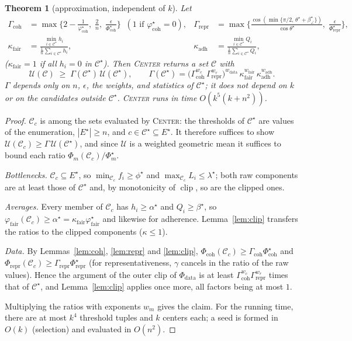 \documentclass[10pt]{article}
\newtheorem{theorem}{Theorem}
\theoremstyle{remark}
\theoremstyle{definition}
\newcommand{\coh}{\varphi_{\text{coh}}}
\newcommand{\clip}{\operatorname{clip}}
\newcommand{\C}{\mathcal{C}}
\begin{document}
\begin{theorem}[approximation, independent of $k$]\label{thm:main}
Let
\begin{align*}
\Gamma_{\text{coh}} &= \max\Big\{ 2 - \tfrac{1}{\coh^\star},\; \tfrac{2}{n},\; \tfrac{\epsilon}{\Phi_{\text{coh}}^\star}
\Big\} \;\;(\text{$1$ if } \coh^\star = 0), &
\Gamma_{\text{repr}} &= \max\Big\{ \tfrac{\cos(\min\{\pi/2,\, \theta^\star + \beta^\star_\angle\})}{\cos\theta^\star},\;
\tfrac{\epsilon}{\Phi_{\text{repr}}^\star} \Big\}, \\
\kappa_{\text{fair}} &= \frac{\min_{i \in \C^\star} h_i}{\frac{1}{n}\sum_{i \in \C^\star} h_i}, &
\kappa_{\text{adh}} &= \frac{\min_{i \in \C^\star} Q_i}{\frac{1}{n}\sum_{i \in \C^\star} Q_i},
\end{align*}
($\kappa_{\text{fair}} = 1$ if all $h_i = 0$ in $\C^\star$). Then \textsc{Center} returns a set $\C$ with
\[
\mathcal{U}(\C) \;\ge\; \Gamma(\C^\star)\, \mathcal{U}(\C^\star), \qquad
\Gamma(\C^\star) = \big(\Gamma_{\text{coh}}^{w_c}\, \Gamma_{\text{repr}}^{w_r}\big)^{w_{\text{data}}}\,
\kappa_{\text{fair}}^{w_{\text{fair}}}\, \kappa_{\text{adh}}^{w_{\text{adh}}} .
\]
$\Gamma$ depends only on $n$, $\epsilon$, the weights, and statistics of $\C^\star$; it does not depend on $k$ or on
the candidates outside $\C^\star$. \textsc{Center} runs in time $O(k^5 (k + n^2))$.
\end{theorem}
\begin{proof}
$\C_c$ is among the sets evaluated by \textsc{Center}: the thresholds of $\C^\star$ are values of the enumeration,
$|E^\star| \ge n$, and $c \in \C^\star \subseteq E^\star$. It therefore suffices to show $\mathcal{U}(\C_c) \ge
\Gamma\, \mathcal{U}(\C^\star)$, and since $\mathcal{U}$ is a weighted geometric mean it suffices to bound each ratio
$\Phi_m(\C_c)/\Phi_m^\star$.

\emph{Bottlenecks.} $\C_c \subseteq E^\star$, so $\min_{\C_c} f_i \ge \phi^\star$ and $\max_{\C_c} L_i \le
\lambda^\star$; both raw components are at least those of $\C^\star$ and, by monotonicity of $\clip$, so are the
clipped ones.

\emph{Averages.} Every member of $\C_c$ has $h_i \ge \alpha^\star$ and $Q_i \ge \beta^\star$, so
$\varphi_{\text{fair}}(\C_c) \ge \alpha^\star = \kappa_{\text{fair}}\varphi_{\text{fair}}^\star$ and likewise for
adherence. Lemma~\ref{lem:clip} transfers the ratios to the clipped components ($\kappa \le 1$).

\emph{Data.} By Lemmas~\ref{lem:coh}, \ref{lem:repr} and \ref{lem:clip}, $\Phi_{\text{coh}}(\C_c) \ge
\Gamma_{\text{coh}}\Phi^\star_{\text{coh}}$ and $\Phi_{\text{repr}}(\C_c) \ge \Gamma_{\text{repr}}
\Phi^\star_{\text{repr}}$ (for representativeness, $\gamma$ cancels in the ratio of the raw values). Hence the
argument of the outer clip of $\Phi_{\text{data}}$ is at least $\Gamma_{\text{coh}}^{w_c}\Gamma_{\text{repr}}^{w_r}$
times that of $\C^\star$, and Lemma~\ref{lem:clip} applies once more, all factors being at most $1$.

Multiplying the ratios with exponents $w_m$ gives the claim. For the running time, there are at most $k^4$ threshold
tuples and $k$ centers each; a seed is formed in $O(k)$ (selection) and evaluated in $O(n^2)$.
\end{proof}
\end{document}

